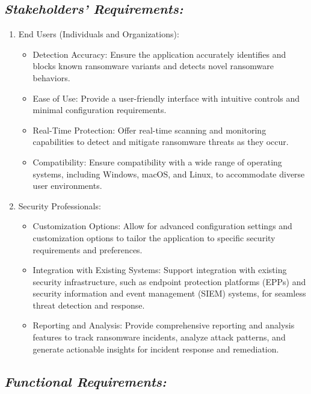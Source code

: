 \documentclass[12pt,twocolumn]{article}
\begin{document}
\subsection{\textbf{\textit{Stakeholders' Requirements:}}}
    \begin{enumerate}[label=\arabic*.]
    \item End Users (Individuals and Organizations):
        \begin{itemize} 
            \item Detection Accuracy: Ensure the application accurately identifies and blocks known ransomware variants and detects novel ransomware behaviors. 
            \item Ease of Use: Provide a user-friendly interface with intuitive controls and minimal configuration requirements.
            \item Real-Time Protection: Offer real-time scanning and monitoring capabilities to detect and mitigate ransomware threats as they occur.
            \item Compatibility: Ensure compatibility with a wide range of operating systems, including Windows, macOS, and Linux, to accommodate diverse user environments.
        \end{itemize}

        \item Security Professionals:
        \begin{itemize}
            \item Customization Options: Allow for advanced configuration settings and customization options to tailor the application to specific security requirements and preferences.
            \item Integration with Existing Systems: Support integration with existing security infrastructure, such as endpoint protection platforms (EPPs) and security information and event management (SIEM) systems, for seamless threat detection and response.
            \item Reporting and Analysis: Provide comprehensive reporting and analysis features to track ransomware incidents, analyze attack patterns, and generate actionable insights for incident response and remediation.
        \end{itemize}
    \end{enumerate}

    
\subsection{\textbf{\textit{Functional Requirements:}}}
\end{document}
